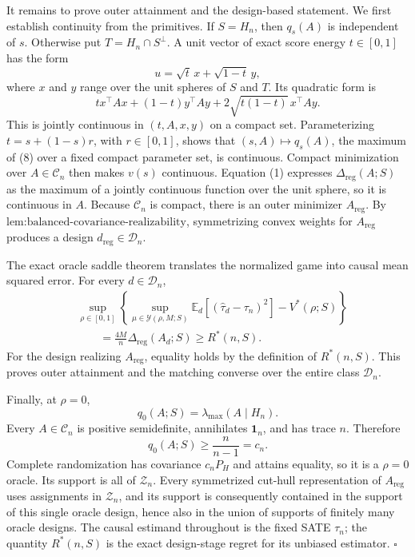 It remains to prove outer attainment and the design-based statement. We first establish continuity from the primitives. If \(S=H_n\), then \(q_s(A)\) is independent of \(s\). Otherwise put \(T=H_n\cap S^\perp\). A unit vector of exact score energy \(t\in[0,1]\) has the form
\[
u=\sqrt t\,x+\sqrt{1-t}\,y,
\]
where \(x\) and \(y\) range over the unit spheres of \(S\) and \(T\). Its quadratic form is
\[
t x^\top Ax+(1-t)y^\top Ay
+2\sqrt{t(1-t)}\,x^\top Ay.
\tag{8}
\]
This is jointly continuous in \((t,A,x,y)\) on a compact set. Parameterizing \(t=s+(1-s)r\), with \(r\in[0,1]\), shows that \((s,A)\mapsto q_s(A)\), the maximum of (8) over a fixed compact parameter set, is continuous. Compact minimization over \(A\in\mathcal C_n\) then makes \(v(s)\) continuous. Equation (1) expresses \(\Delta_{\mathrm{reg}}(A;S)\) as the maximum of a jointly continuous function over the unit sphere, so it is continuous in \(A\). Because \(\mathcal C_n\) is compact, there is an outer minimizer \(A_{\mathrm{reg}}\). By \(\text{lem:balanced-covariance-realizability}\), symmetrizing convex weights for \(A_{\mathrm{reg}}\) produces a design \(d_{\mathrm{reg}}\in\mathcal D_n\).

The exact oracle saddle theorem translates the normalized game into causal mean squared error. For every \(d\in\mathcal D_n\),
\[
\begin{aligned}
&\sup_{\rho\in[0,1]}
\left\{
\sup_{\mu\in\mathcal Y(\rho,M;S)}
\mathbb E_d[(\widehat\tau_d-\tau_n)^2]
-V^*(\rho;S)
\right\}\\
&\qquad=\frac{4M}{n}\Delta_{\mathrm{reg}}(A_d;S)
\geq R^*(n,S).
\end{aligned}
\tag{9}
\]
For the design realizing \(A_{\mathrm{reg}}\), equality holds by the definition of \(R^*(n,S)\). This proves outer attainment and the matching converse over the entire class \(\mathcal D_n\).

Finally, at \(\rho=0\),
\[
q_0(A;S)=\lambda_{\max}(A\mid H_n).
\]
Every \(A\in\mathcal C_n\) is positive semidefinite, annihilates \(\mathbf 1_n\), and has trace \(n\). Therefore
\[
q_0(A;S)\geq\frac{n}{n-1}=c_n.
\]
Complete randomization has covariance \(c_nP_H\) and attains equality, so it is a \(\rho=0\) oracle. Its support is all of \(\mathcal Z_n\). Every symmetrized cut-hull representation of \(A_{\mathrm{reg}}\) uses assignments in \(\mathcal Z_n\), and its support is consequently contained in the support of this single oracle design, hence also in the union of supports of finitely many oracle designs. The causal estimand throughout is the fixed SATE \(\tau_n\); the quantity \(R^*(n,S)\) is the exact design-stage regret for its unbiased estimator. \(\square\)